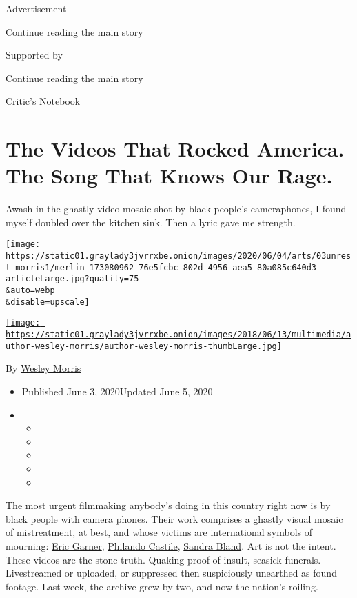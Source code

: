 Advertisement

\protect\hyperlink{after-top}{Continue reading the main story}

Supported by

\protect\hyperlink{after-sponsor}{Continue reading the main story}

Critic's Notebook

\hypertarget{the-videos-that-rocked-america-the-song-that-knows-our-rage}{%
\section{The Videos That Rocked America. The Song That Knows Our
Rage.}\label{the-videos-that-rocked-america-the-song-that-knows-our-rage}}

Awash in the ghastly video mosaic shot by black people's cameraphones, I
found myself doubled over the kitchen sink. Then a lyric gave me
strength.

\texttt{[image: https://static01.graylady3jvrrxbe.onion/images/2020/06/04/arts/03unrest-morris1/merlin\_173080962\_76e5fcbc-802d-4956-aea5-80a085c640d3-articleLarge.jpg?quality=75\\\&auto=webp\\\&disable=upscale]}

\href{https://www.nytimes3xbfgragh.onion/by/wesley-morris}{\texttt{[image: https://static01.graylady3jvrrxbe.onion/images/2018/06/13/multimedia/author-wesley-morris/author-wesley-morris-thumbLarge.jpg]}}

By \href{https://www.nytimes3xbfgragh.onion/by/wesley-morris}{Wesley
Morris}

\begin{itemize}
\item
  Published June 3, 2020Updated June 5, 2020
\item
  \begin{itemize}
  \item
  \item
  \item
  \item
  \item
  \end{itemize}
\end{itemize}

The most urgent filmmaking anybody's doing in this country right now is
by black people with camera phones. Their work comprises a ghastly
visual mosaic of mistreatment, at best, and whose victims are
international symbols of mourning:
\href{https://www.nytimes3xbfgragh.onion/2015/06/14/nyregion/eric-garner-police-chokehold-staten-island.html}{Eric
Garner},
\href{https://www.nytimes3xbfgragh.onion/2017/06/20/us/police-shooting-castile-trial-video.html}{Philando
Castile},
\href{https://www.nytimes3xbfgragh.onion/2019/05/07/us/sandra-bland-video-brian-encinia.html}{Sandra
Bland}. Art is not the intent. These videos are the stone truth. Quaking
proof of insult, seasick funerals. Livestreamed or uploaded, or
suppressed then suspiciously unearthed as found footage. Last week, the
archive grew by two, and now the nation's roiling.


